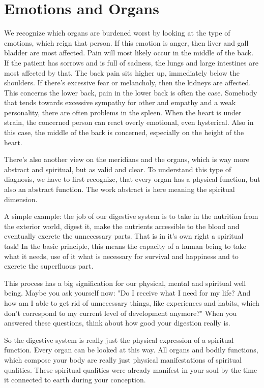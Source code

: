 \documentclass[../Book.Stress_regulation.tex]{subfiles}
\begin{document}
	
\chapter{Emotions and Organs}

We recognize which organs are burdened worst by looking at the type of emotions, 
which reign that person.
If this emotion is anger, then liver and gall bladder are most affected. 
Pain will most likely occur in the middle of the back. 
If the patient has sorrows and is full of sadness, the lungs and large intestines are most affected by that.
The back pain sits higher up, immediately below the shoulders.
If there's excessive fear or melancholy, then the kidneys are affected.
This concerns the lower back, pain in the lower back is often the case.
Somebody that tends towards excessive sympathy for other and empathy and a weak personality,
there are often problems in the spleen.
When the heart is under strain, the concerned person can react overly emotional, even hysterical.
Also in this case, the middle of the back is concerned, especially on the height of the heart.

There's also another view on the meridians and the organs, which is way more abstract and spiritual, but as valid and clear.
To understand this type of diagnosis, we have to first recognize, that every organ has a physical function, but also an abstract function.
The work abstract is here meaning the spiritual dimension.

A simple example: the job of our digestive system is to take in the nutrition from the exterior world, digest it, make the nutrients accessible to the blood and eventually excrete the unnecessary parts.
That is in it's own right a spiritual task!
In the basic principle, this means the capacity of a human being to take what it needs, use of it what is necessary for survival and happiness and to excrete the superfluous part.

This process has a big signification for our physical, mental and spiritual well being.
Maybe you ask yourself now: 
"Do I receive what I need for my life? And how am I able to get rid of unnecessary things, like experiences and habits, which don't correspond to my current level of development anymore?"
When you answered these questions, think about how good your digestion really is.

So the digestive system is really just the physical expression of a spiritual function. 
Every organ can be looked at this way.
All organs and bodily functions, which compose your body are really just physical manifestations of spiritual qualities.
These spiritual qualities were already manifest in your soul by the time it connected to earth during your conception.
\end{document}
